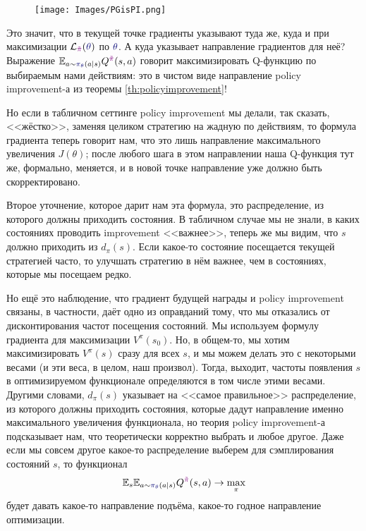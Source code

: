 \begin{figure}
\centering
\texttt{[image: Images/PGisPI.png]}
\vspace{-0.5cm}
\end{figure}

Это значит, что в текущей точке градиенты указывают туда же, куда и при максимизации $\mathcal{L}_{\textcolor{ChadPurple}{\tilde{\pi}}}(\textcolor{ChadBlue}{\theta})$ по $\textcolor{ChadBlue}{\theta}$. А куда указывает направление градиентов для неё? Выражение $\E_{a \sim \textcolor{ChadBlue}{\pi_{\theta}}(a \mid s)} Q^{\textcolor{ChadPurple}{\tilde{\pi}}}(s, a)$ говорит максимизировать Q-функцию по выбираемым нами действиям: это в чистом виде направление policy improvement-а из теоремы \ref{th:policyimprovement}! 

Но если в табличном сеттинге policy improvement мы делали, так сказать, <<жёстко>>, заменяя целиком стратегию на жадную по действиям, то формула градиента теперь говорит нам, что это лишь направление максимального увеличения $J(\theta)$; после любого шага в этом направлении наша Q-функция тут же, формально, меняется, и в новой точке направление уже должно быть скорректировано. 

Второе уточнение, которое дарит нам эта формула, это распределение, из которого должны приходить состояния. В табличном случае мы не знали, в каких состояниях проводить improvement <<важнее>>, теперь же мы видим, что $s$ должно приходить из $d_{\pi}(s)$. Если какое-то состояние посещается текущей стратегией часто, то улучшать стратегию в нём важнее, чем в состояниях, которые мы посещаем редко.

Но ещё это наблюдение, что градиент будущей награды и policy improvement связаны, в частности, даёт одно из оправданий тому, что мы отказались от дисконтирования частот посещения состояний. Мы используем формулу градиента для максимизации $V^\pi(s_0)$. Но, в общем-то, мы хотим максимизировать $V^\pi(s)$ сразу для всех $s$, и мы можем делать это с некоторыми весами (и эти веса, в целом, наш произвол). Тогда, выходит, частоты появления $s$ в оптимизируемом функционале определяются в том числе этими весами. Другими словами, $d_{\pi}(s)$ указывает на <<самое правильное>> распределение, из которого должны приходить состояния, которые дадут направление именно максимального увеличения функционала, но теория policy improvement-а подсказывает нам, что теоретически корректно выбрать и любое другое. Даже если мы совсем другое какое-то распределение выберем для сэмплирования состояний $s$, то функционал
$$\E_{s} \E_{a \sim \textcolor{ChadBlue}{\pi_{\theta}}(a \mid s)} Q^{\textcolor{ChadPurple}{\tilde{\pi}}}(s, a) \to \max_{\pi}$$
будет давать какое-то направление подъёма, какое-то годное направление оптимизации. 

